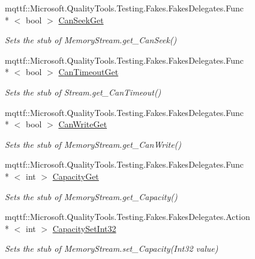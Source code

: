 \begin{DoxyCompactItemize}
mqttf\-::\-Microsoft.\-Quality\-Tools.\-Testing.\-Fakes.\-Fakes\-Delegates.\-Func\\*
$<$ bool $>$ \hyperlink{class_system_1_1_i_o_1_1_fakes_1_1_stub_memory_stream_ab0467525e30d9dd45eee1bdb05d05a25}{Can\-Seek\-Get}
\begin{DoxyCompactList}\small\item\em Sets the stub of Memory\-Stream.\-get\-\_\-\-Can\-Seek()\end{DoxyCompactList}\item 
mqttf\-::\-Microsoft.\-Quality\-Tools.\-Testing.\-Fakes.\-Fakes\-Delegates.\-Func\\*
$<$ bool $>$ \hyperlink{class_system_1_1_i_o_1_1_fakes_1_1_stub_memory_stream_a6497bbe2bd413d4cad1aed0151e2fe73}{Can\-Timeout\-Get}
\begin{DoxyCompactList}\small\item\em Sets the stub of Stream.\-get\-\_\-\-Can\-Timeout()\end{DoxyCompactList}\item 
mqttf\-::\-Microsoft.\-Quality\-Tools.\-Testing.\-Fakes.\-Fakes\-Delegates.\-Func\\*
$<$ bool $>$ \hyperlink{class_system_1_1_i_o_1_1_fakes_1_1_stub_memory_stream_a125881892963e14f093e7fa2b745456d}{Can\-Write\-Get}
\begin{DoxyCompactList}\small\item\em Sets the stub of Memory\-Stream.\-get\-\_\-\-Can\-Write()\end{DoxyCompactList}\item 
mqttf\-::\-Microsoft.\-Quality\-Tools.\-Testing.\-Fakes.\-Fakes\-Delegates.\-Func\\*
$<$ int $>$ \hyperlink{class_system_1_1_i_o_1_1_fakes_1_1_stub_memory_stream_a8cb7e1dd2f0e3ad20a95aef0614f20bb}{Capacity\-Get}
\begin{DoxyCompactList}\small\item\em Sets the stub of Memory\-Stream.\-get\-\_\-\-Capacity()\end{DoxyCompactList}\item 
mqttf\-::\-Microsoft.\-Quality\-Tools.\-Testing.\-Fakes.\-Fakes\-Delegates.\-Action\\*
$<$ int $>$ \hyperlink{class_system_1_1_i_o_1_1_fakes_1_1_stub_memory_stream_a927f07299b228d04eca0380b5419b877}{Capacity\-Set\-Int32}
\begin{DoxyCompactList}\small\item\em Sets the stub of Memory\-Stream.\-set\-\_\-\-Capacity(\-Int32 value)\end{DoxyCompactList}\item 

\end{DoxyCompactItemize}
